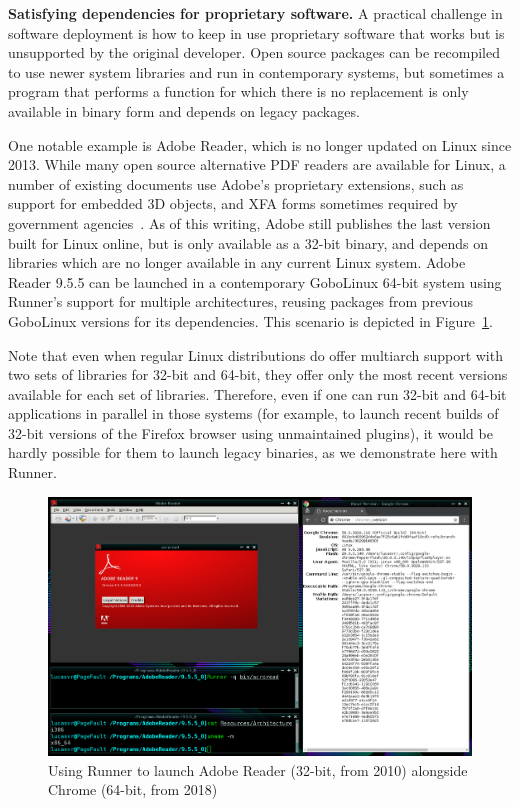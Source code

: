 \documentclass[sigplan, anonymous, 10pt]{acmart}
\begin{document}
\textbf{Satisfying dependencies for proprietary software.}
A practical challenge in software deployment is how to keep in use
proprietary software that works but is unsupported by the original developer.
Open source packages can be recompiled to use newer system libraries and
run in contemporary systems, but sometimes a program that performs
a function for which there is no replacement is only available in binary form
and depends on legacy packages.

One notable example is Adobe Reader, which is no longer updated on Linux since
2013. While many open source alternative PDF readers are available for Linux,
a number of existing documents use Adobe's proprietary extensions, such as
support for embedded 3D objects, and XFA forms sometimes required by
government agencies~\cite{grantsgov:adobe}. As of this writing, Adobe still publishes the last
version built for Linux online, but is only available as a 32-bit binary,
and depends on libraries which are no longer available in any current Linux
system. Adobe Reader 9.5.5 can be launched in a contemporary GoboLinux
64-bit system using Runner's support for multiple architectures,
reusing packages from previous GoboLinux versions for its dependencies.
This scenario is depicted in Figure~\ref{fig:runner}.

Note that even when regular Linux distributions do offer multiarch support
with two sets of libraries for 32-bit and 64-bit, they offer only the most
recent versions available for each set of libraries. Therefore, even if one
can run 32-bit and 64-bit applications in parallel in those systems (for example,
to launch recent builds of 32-bit versions of the Firefox browser
using unmaintained plugins), it would be hardly possible for them to
launch legacy binaries, as we demonstrate here with Runner.

\begin{figure}[!ht]
    \centering
    \includegraphics[width=.75\textwidth]{Runner.png}
    \caption{Using Runner to launch Adobe Reader (32-bit, from 2010) alongside Chrome (64-bit, from 2018)}
    \label{fig:runner}
\end{figure}
\end{document}

